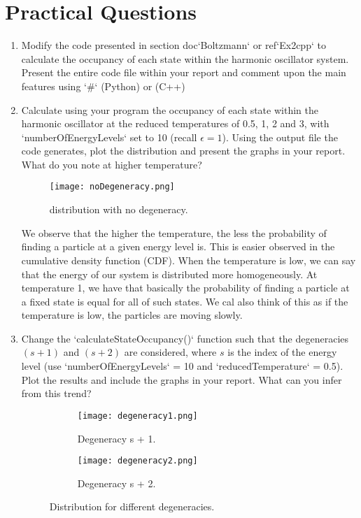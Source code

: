 \documentclass[12pt,letterpaper]{report}
\begin{document}
	\section{Practical Questions}
	\begin{enumerate}
		\item 
		Modify the code presented in section {doc}`Boltzmann` or {ref}`Ex2cpp`  to calculate the
		occupancy of each state within the harmonic oscillator system. Present the entire code file within your report and comment upon the main features using `\#` (Python) or (C++) 			
			
		\item
		Calculate using your program the occupancy of each state within the	harmonic oscillator at the reduced temperatures of 0.5, 1, 2 and 3, with `numberOfEnergyLevels` set to 10 (recall $\epsilon = 1$). Using the output file the code generates, plot the distribution and present the graphs in your report. What do you note at higher temperature?
		
		\begin{figure}[H]
			\centering
			\texttt{[image: noDegeneracy.png]}		
			\caption{distribution with no degeneracy.}
			\label{fig::noDegeneracy}
		\end{figure}  
			
		We observe that the higher the temperature, the less the probability of finding a particle at a given energy level is. This is easier observed in the cumulative density function (CDF). When the temperature is low, we can say that the energy of our system is distributed more homogeneously. At temperature 1, we have that basically the probability of finding a particle at a fixed state is equal for all of such states. We cal also think of this as if the temperature is low, the particles are moving slowly. 
				
		\item
		Change the `calculateStateOccupancy()` function such that the degeneracies $(s + 1)$ and $(s + 2)$ are considered, where $s$ is the index of the energy level (use `numberOfEnergyLevels` = 10 and 		`reducedTemperature` = 0.5). Plot the results and include the graphs in your report. What can you infer from this trend? 
	
		\begin{figure}[H]
			\centering
			\begin{subfigure}[b]{0.7\linewidth}
				\centering
				\texttt{[image: degeneracy1.png]}		
				\caption{Degeneracy s + 1.}
			\end{subfigure}		
			\hfill
			\begin{subfigure}[b]{0.7\linewidth}
				\centering
				\texttt{[image: degeneracy2.png]}
				\caption{Degeneracy s + 2.}
			\end{subfigure}			
			\caption{Distribution for different degeneracies.}
			\label{fig::Degeneracy1}
		\end{figure}  	
		

\end{enumerate}
\end{document}
